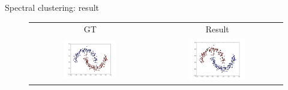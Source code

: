 \bgroup
\begin{frame}{Spectral clustering: result}
\setlength{\tabcolsep}{.07em}
\begin{figure}
\begin{tabular}{cc}
\small{GT} & \small{Result}\\
\includegraphics[width=0.45\textwidth]{img/spectral/gt.pdf}&
\includegraphics[width=0.45\textwidth]{img/spectral/pred.pdf}
\end{tabular}
\end{figure}
\end{frame}
\egroup